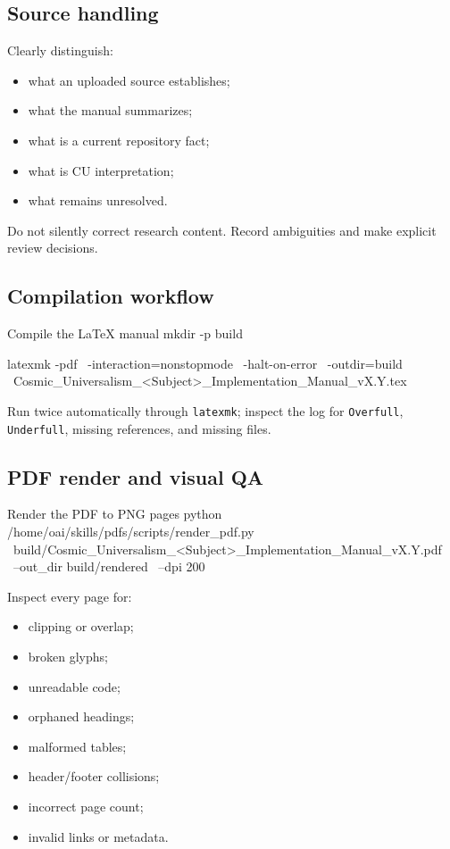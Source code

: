 \documentclass[11pt,letterpaper]{article}
\begin{document}
\subsection{Source handling}

Clearly distinguish:

\begin{itemize}
    \item what an uploaded source establishes;
    \item what the manual summarizes;
    \item what is a current repository fact;
    \item what is CU interpretation;
    \item what remains unresolved.
\end{itemize}

Do not silently correct research content. Record ambiguities and make explicit
review decisions.

\subsection{Compilation workflow}

\begin{commandbox}{Compile the LaTeX manual}
mkdir -p build

latexmk -pdf \
  -interaction=nonstopmode \
  -halt-on-error \
  -outdir=build \
  Cosmic_Universalism_<Subject>_Implementation_Manual_vX.Y.tex
\end{commandbox}

Run twice automatically through \texttt{latexmk}; inspect the log for
\texttt{Overfull}, \texttt{Underfull}, missing references, and missing files.

\subsection{PDF render and visual QA}

\begin{commandbox}{Render the PDF to PNG pages}
python /home/oai/skills/pdfs/scripts/render_pdf.py \
  build/Cosmic_Universalism_<Subject>_Implementation_Manual_vX.Y.pdf \
  --out_dir build/rendered \
  --dpi 200
\end{commandbox}

Inspect every page for:

\begin{itemize}
    \item clipping or overlap;
    \item broken glyphs;
    \item unreadable code;
    \item orphaned headings;
    \item malformed tables;
    \item header/footer collisions;
    \item incorrect page count;
    \item invalid links or metadata.
\end{itemize}
\end{document}

